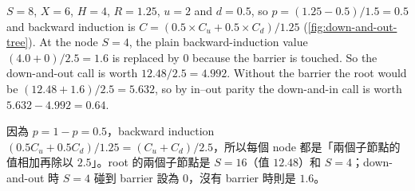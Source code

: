 \suppend

\begin{eg}
	\label{eg:down-and-out-tree}
	$S=8$, $X=6$, $H=4$, $R=1.25$, $u=2$ and $d=0.5$, so $p=(1.25-0.5)/1.5=0.5$ and backward induction is $C=(0.5\times C_{u}+0.5\times C_{d})/1.25$ (\autoref{fig:down-and-out-tree}).
	At the node $S=4$, the plain backward-induction value $(4.0+0)/2.5=1.6$ is replaced by $0$ because the barrier is touched.
	So the down-and-out call is worth $12.48/2.5=4.992$.
	\suppstart
	Without the barrier the root would be $(12.48+1.6)/2.5=5.632$, so by in--out parity the down-and-in call is worth $5.632-4.992=0.64$.
	\suppend
\end{eg}

\suppstart
{}

\begin{remark}
	因為 $p=1-p=0.5$，backward induction $(0.5C_{u}+0.5C_{d})/1.25=(C_{u}+C_{d})/2.5$，所以每個 node 都是「兩個子節點的值相加再除以 $2.5$」。root 的兩個子節點是 $S=16$（值 $12.48$）和 $S=4$；down-and-out 時 $S=4$ 碰到 barrier 設為 $0$，沒有 barrier 時則是 $1.6$。
\end{remark}
\suppend

